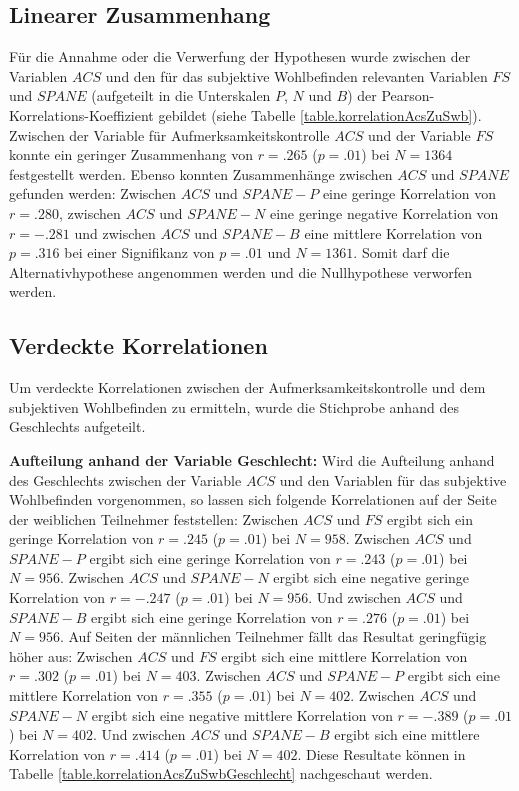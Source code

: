 \subsection{Linearer Zusammenhang}
Für die Annahme oder die Verwerfung der Hypothesen wurde zwischen der Variablen $ACS$ und den für das subjektive Wohlbefinden relevanten Variablen $FS$ und $SPANE$ (aufgeteilt in die Unterskalen $P$, $N$ und $B$) der Pearson-Korrelations-Koeffizient gebildet (siehe Tabelle \ref{table.korrelationAcsZuSwb}). Zwischen der Variable für Aufmerksamkeitskontrolle $ACS$ und der Variable $FS$ konnte ein geringer Zusammenhang von $r=.265$ ($p=.01$) bei $N=1364$ festgestellt werden. Ebenso konnten Zusammenhänge zwischen $ACS$ und $SPANE$ gefunden werden: Zwischen $ACS$ und $SPANE-P$ eine geringe Korrelation von $r=.280$, zwischen $ACS$ und $SPANE-N$ eine geringe negative Korrelation von $r=-.281$ und zwischen $ACS$ und $SPANE-B$ eine mittlere Korrelation von $p=.316$ bei einer Signifikanz von $p=.01$ und $N=1361$. Somit darf die Alternativhypothese angenommen werden und die Nullhypothese verworfen werden. 

\subsection{Verdeckte Korrelationen}
Um verdeckte Korrelationen zwischen der Aufmerksamkeitskontrolle und dem subjektiven Wohlbefinden zu ermitteln, wurde die Stichprobe anhand des Geschlechts aufgeteilt.
\par
\textbf{Aufteilung anhand der Variable Geschlecht:} Wird die Aufteilung anhand des Geschlechts zwischen der Variable $ACS$ und den Variablen für das subjektive Wohlbefinden vorgenommen, so lassen sich folgende Korrelationen auf der Seite der weiblichen Teilnehmer feststellen: Zwischen $ACS$ und $FS$ ergibt sich ein geringe Korrelation von $r=.245$ ($p=.01$) bei $N=958$. Zwischen $ACS$ und $SPANE-P$ ergibt sich eine geringe Korrelation von $r=.243$ ($p=.01$) bei $N=956$. Zwischen $ACS$ und $SPANE-N$ ergibt sich eine negative geringe Korrelation von $r=-.247$ ($p=.01$) bei $N=956$. Und zwischen $ACS$ und $SPANE-B$ ergibt sich eine geringe Korrelation von $r=.276$ ($p=.01$) bei $N=956$. Auf Seiten der männlichen Teilnehmer fällt das Resultat geringfügig höher aus: Zwischen $ACS$ und $FS$ ergibt sich eine mittlere Korrelation von $r=.302$ ($p=.01$) bei $N=403$. Zwischen $ACS$ und $SPANE-P$ ergibt sich eine mittlere Korrelation von $r=.355$ ($p=.01$) bei $N=402$. Zwischen $ACS$ und $SPANE-N$ ergibt sich eine negative mittlere Korrelation von $r=-.389$ ($p=.01$) bei $N=402$. Und zwischen $ACS$ und $SPANE-B$ ergibt sich eine mittlere Korrelation von $r=.414$ ($p=.01$) bei $N=402$. Diese Resultate können in Tabelle \ref{table.korrelationAcsZuSwbGeschlecht} nachgeschaut werden.

